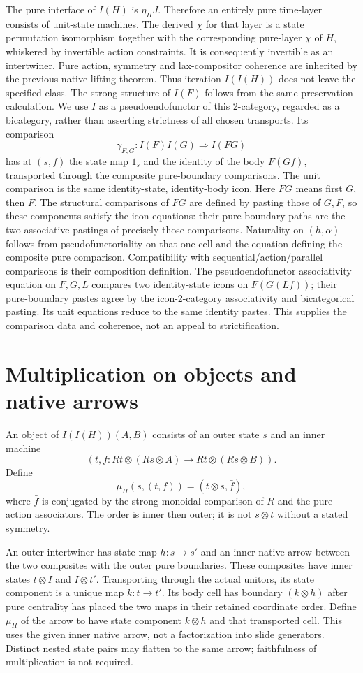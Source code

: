 \documentclass{article}
\begin{document}
The pure interface of $I(H)$ is $\eta_HJ$. Therefore an entirely pure time-layer consists of unit-state machines. The derived $\chi$ for that layer is a state permutation isomorphism together with the corresponding pure-layer $\chi$ of $H$, whiskered by invertible action constraints. It is consequently invertible as an intertwiner. Pure action, symmetry and lax-compositor coherence are inherited by the previous native lifting theorem. Thus iteration $I(I(H))$ does not leave the specified class. The strong structure of $I(F)$ follows from the same preservation calculation. We use $I$ as a pseudoendofunctor of this 2-category, regarded as a bicategory, rather than asserting strictness of all chosen transports. Its comparison
\[
\gamma_{F,G}: I(F)I(G)\Rightarrow I(FG)
\]
has at $(s,f)$ the state map $1_s$ and the identity of the body $F(Gf)$, transported through the composite pure-boundary comparisons. The unit comparison is the same identity-state, identity-body icon. Here $FG$ means first $G$, then $F$. The structural comparisons of $FG$ are defined by pasting those of $G,F$, so these components satisfy the icon equations: their pure-boundary paths are the two associative pastings of precisely those comparisons. Naturality on $(h,\alpha)$ follows from pseudofunctoriality on that one cell and the equation defining the composite pure comparison. Compatibility with sequential/action/parallel comparisons is their composition definition. The pseudoendofunctor associativity equation on $F,G,L$ compares two identity-state icons on $F(G(Lf))$; their pure-boundary pastes agree by the icon-2-category associativity and bicategorical pasting. Its unit equations reduce to the same identity pastes. This supplies the comparison data and coherence, not an appeal to strictification.

\section{Multiplication on objects and native arrows}
An object of $I(I(H))(A,B)$ consists of an outer state $s$ and an inner machine
\[
(t,f:Rt\otimes(Rs\otimes A)\longrightarrow Rt\otimes(Rs\otimes B)).
\]
Define
\[
\mu_H(s,(t,f))=(t\otimes s,\bar f),
\]
where $\bar f$ is conjugated by the strong monoidal comparison of $R$ and the pure action associators. The order is inner then outer; it is not $s\otimes t$ without a stated symmetry.

An outer intertwiner has state map $h:s\to s'$ and an inner native arrow between the two composites with the outer pure boundaries. These composites have inner states $t\otimes I$ and $I\otimes t'$. Transporting through the actual unitors, its state component is a unique map $k:t\to t'$. Its body cell has boundary $(k\otimes h)$ after pure centrality has placed the two maps in their retained coordinate order. Define $\mu_H$ of the arrow to have state component $k\otimes h$ and that transported cell. This uses the given inner native arrow, not a factorization into slide generators. Distinct nested state pairs may flatten to the same arrow; faithfulness of multiplication is not required.
\end{document}
